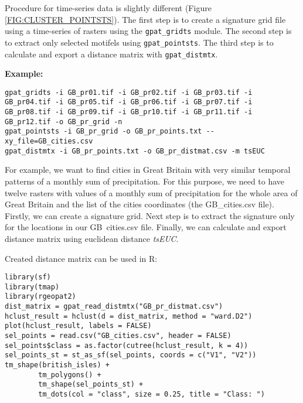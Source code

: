 Procedure for time-series data is slightly different (Figure \ref{FIG:CLUSTER_POINTSTS}).
The first step is to create a signature grid file using a time-series of rasters using the {\tt gpat\_gridts} module.
The second step is to extract only selected motifels using {\tt gpat\_pointsts}.
The third step is to calculate and export a distance matrix with {\tt gpat\_distmtx}.

{\bf Example:}

\begin{minipage}{\linewidth}
\begin{lstlisting}
gpat_gridts -i GB_pr01.tif -i GB_pr02.tif -i GB_pr03.tif -i GB_pr04.tif -i GB_pr05.tif -i GB_pr06.tif -i GB_pr07.tif -i GB_pr08.tif -i GB_pr09.tif -i GB_pr10.tif -i GB_pr11.tif -i GB_pr12.tif -o GB_pr_grid -n
gpat_pointsts -i GB_pr_grid -o GB_pr_points.txt --xy_file=GB_cities.csv
gpat_distmtx -i GB_pr_points.txt -o GB_pr_distmat.csv -m tsEUC 
\end{lstlisting}
\end{minipage}

For example, we want to find cities in Great Britain with very similar temporal patterns of a monthly sum of precipitation. 
For this purpose, we need to have twelve rasters with values of a monthly sum of precipitation for the whole area of Great Britain and the list of the cities coordinates (the GB\_cities.csv file).
Firstly, we can create a signature grid. 
Next step is to extract the signature only for the locations in our GB\ cities.csv file.
Finally, we can calculate and export distance matrix using euclidean distance {\it tsEUC}.

Created distance matrix can be used in R:

\begin{minipage}{\linewidth}
\begin{lstlisting}
library(sf)
library(tmap)
library(rgeopat2)
dist_matrix = gpat_read_distmtx("GB_pr_distmat.csv")
hclust_result = hclust(d = dist_matrix, method = "ward.D2")
plot(hclust_result, labels = FALSE)
sel_points = read.csv("GB_cities.csv", header = FALSE) 
sel_points$class = as.factor(cutree(hclust_result, k = 4))
sel_points_st = st_as_sf(sel_points, coords = c("V1", "V2"))
tm_shape(british_isles) +
        tm_polygons() +
        tm_shape(sel_points_st) +
        tm_dots(col = "class", size = 0.25, title = "Class: ")
\end{lstlisting}
\end{minipage}

